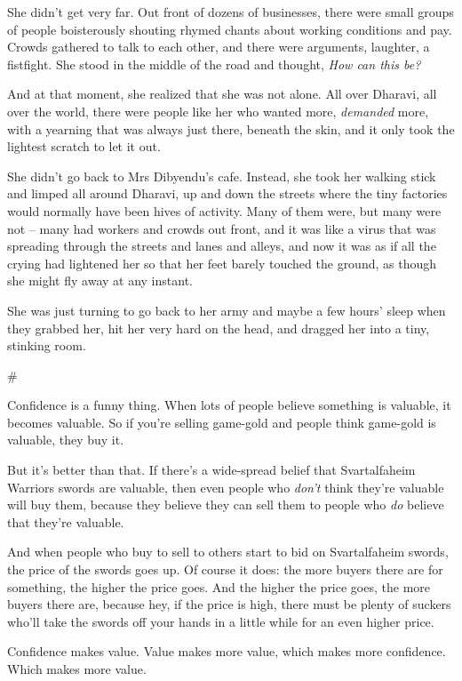 She didn't get very far. Out front of dozens of businesses, there
were small groups of people boisterously shouting rhymed chants
about working conditions and pay. Crowds gathered to talk to each
other, and there were arguments, laughter, a fistfight. She stood
in the middle of the road and thought, \emph{How can this be?}

And at that moment, she realized that she was not alone. All over
Dharavi, all over the world, there were people like her who wanted
more, \emph{demanded} more, with a yearning that was always just
there, beneath the skin, and it only took the lightest scratch to
let it out.

She didn't go back to Mrs Dibyendu's cafe. Instead, she took her
walking stick and limped all around Dharavi, up and down the
streets where the tiny factories would normally have been hives of
activity. Many of them were, but many were not -- many had workers
and crowds out front, and it was like a virus that was spreading
through the streets and lanes and alleys, and now it was as if all
the crying had lightened her so that her feet barely touched the
ground, as though she might fly away at any instant.

She was just turning to go back to her army and maybe a few hours'
sleep when they grabbed her, hit her very hard on the head, and
dragged her into a tiny, stinking room.

\#

Confidence is a funny thing. When lots of people believe something
is valuable, it becomes valuable. So if you're selling game-gold
and people think game-gold is valuable, they buy it.

But it's better than that. If there's a wide-spread belief that
Svartalfaheim Warriors swords are valuable, then even people who
\emph{don't} think they're valuable will buy them, because they
believe they can sell them to people who \emph{do} believe that
they're valuable.

And when people who buy to sell to others start to bid on
Svartalfaheim swords, the price of the swords goes up. Of course it
does: the more buyers there are for something, the higher the price
goes. And the higher the price goes, the more buyers there are,
because hey, if the price is high, there must be plenty of suckers
who'll take the swords off your hands in a little while for an even
higher price.

Confidence makes value. Value makes more value, which makes more
confidence. Which makes more value.

